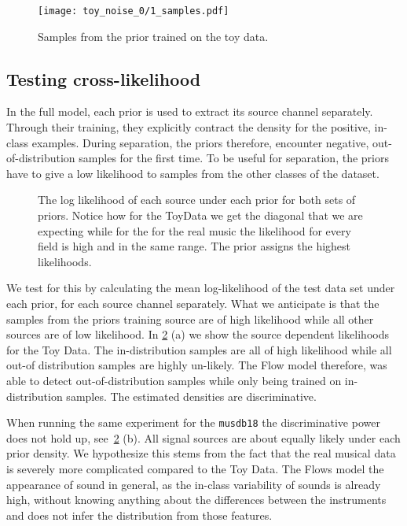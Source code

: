 \begin{figure}
    \texttt{[image: toy\_noise\_0/1\_samples.pdf]}%
    \label{fig:toy_time_sample}%
    \caption{Samples from the prior trained on the toy data.}
\end{figure}

\subsection{Testing cross-likelihood}
In the full model, each prior is used to extract its source channel separately. Through their training, they explicitly contract the density for the positive, in-class examples. During separation, the priors therefore, encounter negative, out-of-distribution samples for the first time. To be useful for separation, the priors have to give a low likelihood to samples from the other classes of the dataset.

\begin{figure}
    \centering
    \caption{The log likelihood of each source under each prior for both sets of priors. Notice how for the ToyData we get the diagonal that we are expecting while for the for the real music the likelihood for every field is high and in the same range. The  prior assigns the highest likelihoods.}%
    \label{fig:noiseless_channels}%
\end{figure}

We test for this by calculating the mean log-likelihood of the test data set under each prior, for each source channel separately. What we anticipate is that the samples from the priors training source are of high likelihood while all other sources are of low likelihood. In \cref{fig:noiseless_channels} (a) we show the source dependent likelihoods for the Toy Data. The in-distribution samples are all of high likelihood while all out-of distribution samples are highly un-likely. The Flow model therefore, was able to detect out-of-distribution samples while only being trained on in-distribution samples. The estimated densities are discriminative.

When running the same experiment for the \texttt{musdb18} the discriminative power does not hold up, see~\cref{fig:noiseless_channels} (b). All signal sources are about equally likely under each prior density. We hypothesize this stems from the fact that the real musical data is severely more complicated compared to the Toy Data. The Flows model the appearance of sound in general, as the in-class variability of sounds is already high, without knowing anything about the  differences between the instruments and does not infer the distribution from those features.

